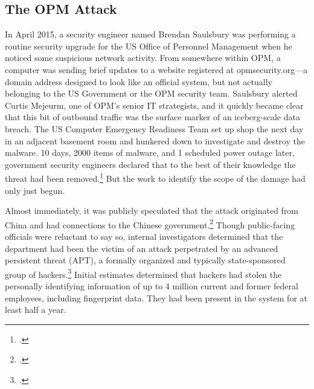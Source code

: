 \documentclass{report}
\begin{document}
\begin{refsegment}

\section{The OPM Attack}
In April 2015, a security engineer named Brendan Saulsbury was performing a routine security upgrade for the US Office of Personnel Management when he noticed some suspicious network activity. From somewhere within OPM, a computer was sending brief updates to a website registered at opmsecurity.org---a domain address designed to look like an official system, but not actually belonging to the US Government or the OPM security team. Saulsbury alerted Curtis Mejeurm, one of OPM's senior IT strategists, and it quickly became clear that this bit of outbound traffic was the surface marker of an iceberg-scale data breach. The US Computer Emergency Readiness Team set up shop the next day in an adjacent basement room and hunkered down to investigate and destroy the malware. 10 days, 2000 items of malware, and 1 scheduled power outage later, government security engineers declared that to the best of their knowledge the threat had been removed.\footcite{koerner_inside_2016} But the work to identify the scope of the damage had only just begun.

Almost immediately, it was publicly speculated that the attack originated from China and had connections to the Chinese government.\footcite{spetalnick_china_2015} Though public-facing officials were reluctant to say so, internal investigators determined that the department had been the victim of an attack perpetrated by an advanced persistent threat (APT), a formally organized and typically state-sponsored group of hackers.\footcite[Attributing a cyberattack is difficult because hackers have endless means to obscure their orgins. In this case, however, the first clue that investigators found was left there on purpose. A particularly effective group of hackers tied to China has made it a calling card of sorts to register sites using the names of members of Marvel's comic book superhero group, The Avengers. In this case, opmsecurity.org was registered under the name "Steve Rogers," better known as Captain America.]{koerner_inside_2016} Initial estimates determined that hackers had stolen the personally identifying information of up to 4 million current and former federal employees, including fingerprint data. They had been present in the system for at least half a year.


\end{refsegment}
\end{document}
